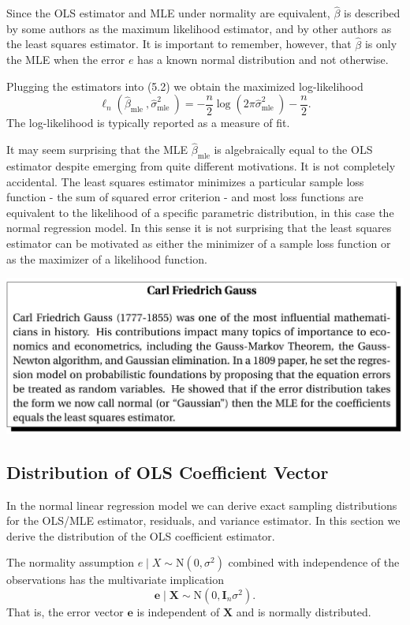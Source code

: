 \documentclass[10pt]{article}
\begin{document}
Since the OLS estimator and MLE under normality are equivalent, $\widehat{\beta}$ is described by some authors as the maximum likelihood estimator, and by other authors as the least squares estimator. It is important to remember, however, that $\widehat{\beta}$ is only the MLE when the error $e$ has a known normal distribution and not otherwise.

Plugging the estimators into (5.2) we obtain the maximized log-likelihood
$$
\ell_{n}\left(\widehat{\beta}_{\text {mle }}, \widehat{\sigma}_{\text {mle }}^{2}\right)=-\frac{n}{2} \log \left(2 \pi \widehat{\sigma}_{\text {mle }}^{2}\right)-\frac{n}{2} .
$$
The log-likelihood is typically reported as a measure of fit.

It may seem surprising that the MLE $\widehat{\beta}_{\mathrm{mle}}$ is algebraically equal to the OLS estimator despite emerging from quite different motivations. It is not completely accidental. The least squares estimator minimizes a particular sample loss function - the sum of squared error criterion - and most loss functions are equivalent to the likelihood of a specific parametric distribution, in this case the normal regression model. In this sense it is not surprising that the least squares estimator can be motivated as either the minimizer of a sample loss function or as the maximizer of a likelihood function.

\includegraphics[max width=\textwidth]{2022_09_17_d221298fd653b1ce6adbg-07}

\subsection{Distribution of OLS Coefficient Vector}
In the normal linear regression model we can derive exact sampling distributions for the OLS/MLE estimator, residuals, and variance estimator. In this section we derive the distribution of the OLS coefficient estimator.

The normality assumption $e \mid X \sim \mathrm{N}\left(0, \sigma^{2}\right)$ combined with independence of the observations has the multivariate implication
$$
\boldsymbol{e} \mid \boldsymbol{X} \sim \mathrm{N}\left(0, \boldsymbol{I}_{n} \sigma^{2}\right) .
$$
That is, the error vector $\boldsymbol{e}$ is independent of $\boldsymbol{X}$ and is normally distributed.
\end{document}
